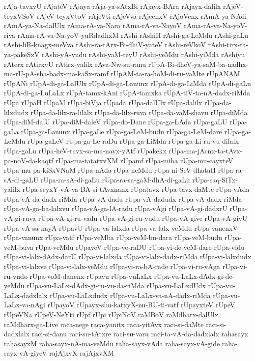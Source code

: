 {rAja-tavxvU
rAjateV
rAjaya
rAja-ya-sAtxBi
rAjayx-BAra
rAjayx-dalilx
rAjeV-teyxVSoV
rAjeV-teyxVtoV
rAjeVti
rAjeVva
rAjecnxV
rAjoVcnx
rAmA-ya-NAdi
rAmA-ya-Na-dalUlx
rAma-rA-va-Nara
rAma-rA-va-NayoV
rAma-rA-va-Na-yoV-riva
rAma-rA-va-Na-yoV-yuRdadhxM
rAshi
rAshiH
rAshi-ga-LeMdu
rAshi-gaLu
rAshi-liR-knagx-meVva
rAshi-ra-tArx-Bi-dhiV-yateV
rAshi-reVkoV
rAshi-tirx-ta-ya-pakeSxV
rAshi-yA-vudu
rAshi-yaM-teyU
rAshi-yeMdu
rAshi-yiMda
rAshiyu
rAterx
rAtirxyU
rAtirx-yalilx
rAva-Nw-su-ranu
rUpA-Bi-dheV-ya-saM-ba-nadhx-ma-rU-pA-sha-badx-ma-kaSx-ramf
rUpAM-ta-ra-hoM-di-ru-vaMte
rUpANAM
rUpANi
rUpA-di-ga-LalUlx
rUpA-di-ga-Lanunx
rUpA-di-ga-LiMda
rUpA-di-gaLu
rUpA-di-ga-LuLaLx
rUpA-tamx-kAni
rUpA-tamxka
rUpA-tiV-ta-nA-dadx-riMda
rUpa
rUpaH
rUpaM
rUpa-biVja
rUpada
rUpa-dalUlx
rUpa-dalilx
rUpa-da-lilxdudx
rUpa-da-lilx-ra-lilalx
rUpa-da-lilx-ruva
rUpa-da-vaM-shavu
rUpa-diMda
rUpa-diM-dalU
rUpa-diM-daleV
rUpa-do-Dane
rUpa-ga-LAda
rUpa-gaLU
rUpa-gaLa
rUpa-ga-Lanunx
rUpa-gaLe
rUpa-ga-LeM-budu
rUpa-ga-LeM-dare
rUpa-ga-LeMdu
rUpa-gaLeV
rUpa-ga-Le-raDu
rUpa-ga-LiMda
rUpa-ga-Li-ru-vu-dilalx
rUpa-gaLu
rUpa-heV-tavx-sa-ma-navx-yAtf
rUpakekx
rUpa-ma-jAcnx-ta-tAvx-pa-noV-da-kaqtf
rUpa-ma-tatatxvXM
rUpamf
rUpa-miha
rUpa-mu-cayxteV
rUpa-mu-pa-kiSxVNaM
rUpa-nAda
rUpa-neMdu
rUpa-ni-SeV-dhataH
rUpa-ra-sA-di-gaLU
rUpa-ra-sA-di-gaLu
rUpa-ra-sa-gaM-dhA-di-gaLu
rUpa-saq-SiTx-yalilx
rUpa-seyxY-vA-va-BA-si-tAvxnanx
rUpatavx
rUpa-tavx-daMte
rUpa-vAda
rUpa-vA-da-dadx-riMda
rUpa-vA-dadu
rUpa-vA-dadudx
rUpa-vA-dadx-riMda
rUpa-vA-ga-ba-lalxvu
rUpa-vA-ga-lA-radu
rUpa-vAgi
rUpa-vA-gi-dadxrU
rUpa-vA-gi-ruva
rUpa-vA-gi-ru-vadu
rUpa-vA-gi-ru-vudu
rUpa-vA-give
rUpa-vA-giyU
rUpa-vA-sa-nayA
rUpavU
rUpa-va-lalxda
rUpa-va-lalx-veMdu
rUpa-vanenxV
rUpa-vanunx
rUpa-vatf
rUpa-veMba
rUpa-veM-bu-dara
rUpa-veM-budu
rUpa-veM-buva
rUpa-veMdu
rUpaveV
rUpa-ve-raDU
rUpa-vi-de-yeM-dare
rUpa-vidu
rUpa-vi-lalx-dAdx-darU
rUpa-vi-lalxda
rUpa-vi-lalx-dadx-riMda
rUpa-vi-lalxdudx
rUpa-vi-lalxve
rUpa-vi-lalx-veMdu
rUpa-vi-ra-bA-rade
rUpa-vi-ru-vAga
rUpa-vi-ru-vudo
rUpa-voM-danenx
rUpavu
rUpa-vuLaLx
rUpa-vu-LaLx-dAdx-gi-de-yeMdu
rUpa-vu-LaLx-dAdx-gi-ru-vu-da-riMda
rUpa-vu-LaLxdUdx
rUpa-vu-LaLx-dadxlalx
rUpa-vu-LaLxdudx
rUpa-vu-LaLx-va-nA-dadx-riMda
rUpa-vu-LaLx-va-nAgi
rUpayoV
rUpayx-shu-katxyX-nu-BU-ti-vatf
rUpayxteV
rUpeV
rUpeVNa
rUpeV-NeYti
rUpf
rUpi
rUpiNoV
raMBoV
raMdharx-dalUlx
raMdharx-ga-Live
raca-nege
raca-yanitx
raca-yitAvx
raci-si-daMte
raci-si-dadxlalx
raci-si-danu
raci-su-tAtxre
raci-su-varu
raci-ta-vA-da-dadxlalx
rahasayx
rahasayxM
raha-sayx-nA-ma-veMdu
raha-sayx-vAda
raha-sayx-vA-gide
raha-sayx-vA-giyeV
rajAjxvX
rajAjxvXM
}
